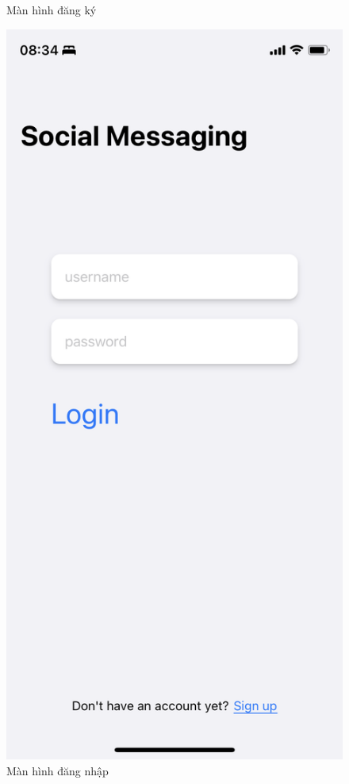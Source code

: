 \documentclass[../DoAn.tex]{subfiles}
\begin{document}
\begin{figure}[H]
\begin{minipage}{0.5\textwidth}
\caption{Màn hình đăng ký} \label{fig:screen_login}
\end{minipage}
\hspace{\fill}
\begin{minipage}{0.5\textwidth}
\includegraphics[width=0.95\linewidth]{Hinhve/Application/SignIn.png}
\caption{Màn hình đăng nhập} \label{fig:list_task}
\end{minipage}
\end{figure}
\hfill
\end{document}
